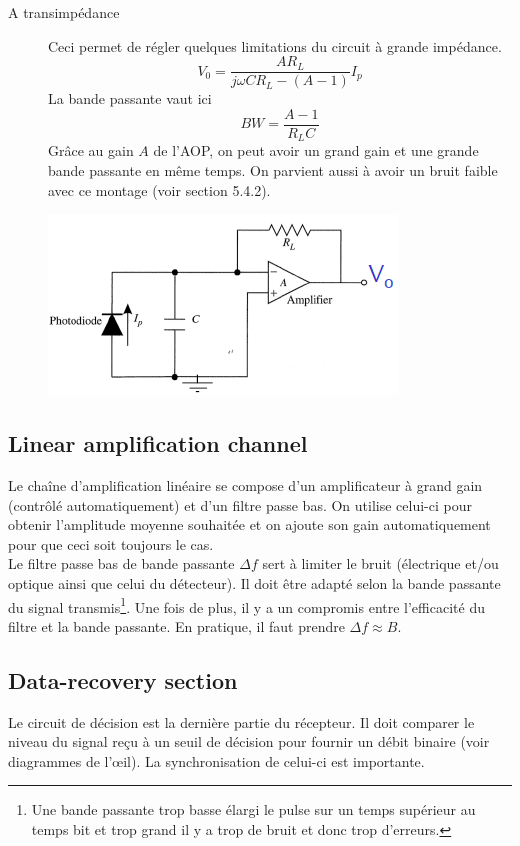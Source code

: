 \begin{description}
\item[A transimpédance] Ceci permet de régler quelques limitations du circuit à grande impédance. 
\begin{equation}
{V_0} = \frac{{A{R_L}}}{{j\omega C{R_L} - (A - 1)}}{I_p}
\end{equation}
La bande passante vaut ici
\begin{equation}
BW = \dfrac{A-1}{R_LC}
\end{equation}
Grâce au gain $A$ de l'AOP, on peut avoir un grand gain et une grande bande passante en même temps. 
On parvient aussi à avoir un bruit faible avec ce montage (voir section 5.4.2).
\begin{center}
\includegraphics[scale=0.5]{ch5/image10}
\end{center}
\end{description}

\subsection{Linear amplification channel}
Le chaîne d'amplification linéaire se compose d'un amplificateur à grand gain (contrôlé 
automatiquement) et d'un filtre passe bas. On utilise celui-ci pour obtenir l'amplitude moyenne
souhaitée et on ajoute son gain automatiquement pour que ceci soit toujours le cas. \\

Le filtre passe bas de bande passante $\Delta f$ sert à limiter le bruit (électrique et/ou optique 
ainsi que celui du détecteur). Il doit être adapté selon la bande passante du signal 
transmis\footnote{Une bande passante trop basse élargi le pulse sur un temps supérieur au temps bit
et trop grand il y a trop de bruit et donc trop d'erreurs.}. Une fois de plus, il y a un compromis
entre l'efficacité du filtre et la bande passante. En pratique, il faut prendre $\Delta f \approx B$.

\subsection{Data-recovery section}
Le circuit de décision est la dernière partie du récepteur. Il doit comparer le niveau du signal
reçu à un seuil de décision pour fournir un débit binaire (voir diagrammes de l'œil). La 
synchronisation de celui-ci est importante. 

